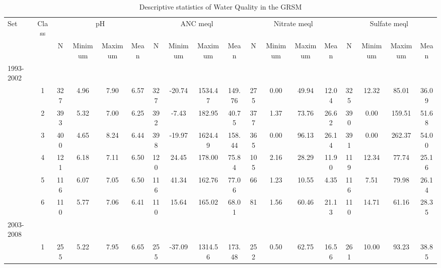 \begin{sidewaystable}[h]\scriptsize
\caption{Descriptive statistics of Water Quality in the GRSM}
\begin{tabular}{p{.5cm}ccccccccccccccccc}
\toprule
Set                & Class & \multicolumn{ 4}{c}{pH}                        & \multicolumn{4}{c}{ANC meql}             & \multicolumn{4}{c}{Nitrate meql}               & \multicolumn{4}{c}{Sulfate meql} \\ \cline{3-18}\noalign{\smallskip}
                     &           & N    & Minimum & Maximum & Mean       & N     & Minimum & Maximum & Mean      & N     & Minimum & Maximum & Mean            & N     & Minimum & Maximum & Mean \\ 
\midrule
1993-2002 \\
                     &1         & 327 & 4.96      & 7.90         & 6.57        & 327 & -20.74    & 1534.47  & 149.76    & 275 & 0.00       & 49.94       & 12.04           & 325 & 12.32      & 85.01      & 36.09  \\ 
                     & 2        & 393 & 5.32      & 7.00         & 6.25        & 392 & -7.43      & 182.95    & 40.75      & 377 & 1.37       & 73.76       & 26.62           & 390 & 0.00        & 159.51    & 51.68  \\ 
                     & 3        & 400 & 4.65      & 8.24        & 6.44         & 398 & -19.97   & 1624.49  & 158.44    & 365 & 0.00       & 96.13       & 26.14           & 391 & 0.00        & 262.37    & 54.00  \\ 
                     & 4        & 121 & 6.18      & 7.11        & 6.50         & 120 & 24.45     & 178.00    & 75.84      & 105 & 2.16       & 28.29       & 11.90           & 119 & 12.34      & 77.74      & 25.16  \\ 
                     &5         & 116 & 6.07      & 7.05        & 6.50         & 116 & 41.34     & 162.76    & 77.06      & 66   & 1.23       & 10.55       & 4.35             & 116 & 7.51         & 79.98     & 26.14  \\ 
                     & 6        & 110 & 5.77      & 7.06        & 6.41         & 110 & 15.64     & 165.02    & 68.01      & 81   & 1.56       & 60.46       & 21.13           & 110 & 14.71      & 61.16     & 28.35  \\ 
2003-2008 \\
                    &1          & 255 & 5.22      & 7.95        & 6.65         & 255 & -37.09    & 1314.56  & 173.48    & 252 & 0.50       & 62.75       & 16.56           & 261 & 10.00      & 93.23     & 38.85  \\ 

\end{tabular}
\end{sidewaystable}
